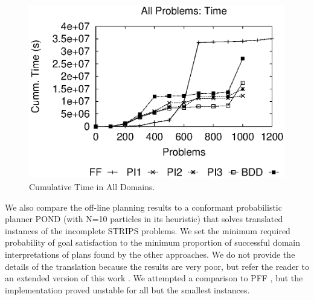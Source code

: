 \documentclass[letterpaper]{article}
\def\citep#1{\cite{#1}}
\begin{document}
\begin{figure}[t]\centering
\includegraphics[width=\linewidth]{WeberBryceICAPS11Fig2.eps}
\caption{\label{fig:alltotaltime}Cumulative Time  in  All Domains.}
\end{figure} 

We also compare the off-line planning results to a conformant probabilistic
planner POND (with N=10 particles in its heuristic) \citep{aij-mclug} that solves
translated instances of the incomplete STRIPS problems.  We set the minimum
required probability of goal satisfaction to the minimum proportion of
successful domain interpretations of plans found by the other approaches. We do
not provide the details of the translation because the results are very poor,
but refer the reader to an extended version of this work
\citep{USU-CS-TR-11-001}.  We attempted a comparison to PFF \citep{pff}, but the
implementation proved unstable for all but the smallest instances.
\end{document}
